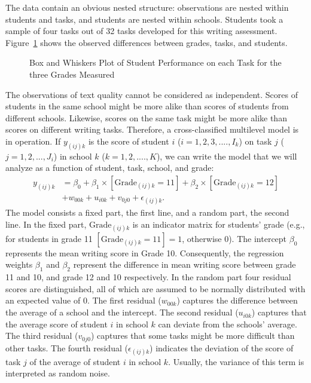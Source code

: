 \documentclass[man, floatsintext]{apa7}
\newenvironment{nscenter}
{\parskip=0pt\par\nopagebreak\centering}
{\par\noindent\ignorespacesafterend}
\newcommand\PlaceInsert[1]{%
	\smallskip%
	\begin{nscenter}
		\framebox{\Cref{#1} about here.}
	\end{nscenter}
	\smallskip%
}
\begin{document}
The data contain an obvious nested structure: observations are nested within students and tasks, and students are nested within schools.
Students took a sample of four tasks out of 32 tasks developed for this writing assessment.
Figure~\ref{fig:baselineDescriptives} shows the observed differences between grades, tasks, and students.
\PlaceInsert{fig:baselineDescriptives}
\begin{figure}[!ht]
	\caption{Box and Whiskers Plot of Student Performance on each Task for the three Grades Measured}
	\label{fig:baselineDescriptives}
\end{figure}
The observations of text quality cannot be considered as independent.
Scores of students in the same school might be more alike than scores of students from different schools.
Likewise, scores on the same task might be more alike than scores on different writing tasks.
Therefore, a cross-classified multilevel model is in operation.
If $y_{(ij)k}$ is the score of student $i$ ($i = 1, 2, 3, ...., I_k$) on task $j$ ($j = 1, 2, ..., J_i$) in school $k$ ($k = 1, 2, ...., K$), we can write the model that we will analyze as a function of student, task, school, and grade:
\begin{align*}
	y_{(ij)k} &= \beta_0 + \beta_1 \times [\mathrm{Grade}_{(ij)k}=11] + \beta_2 \times [\mathrm{Grade}_{(ij)k}=12]\\
			  &+ w_{00k} + u_{i0k} + v_{0j0} + \epsilon_{(ij)k}.
\end{align*}
The model consists a fixed part, the first line, and a random part, the second line. In the fixed part, $\mathrm{Grade}_{(ij)k}$ is an indicator matrix for students' grade (e.g., for students in grade 11 $[\mathrm{Grade}_{(ij)k}=11] = 1$, otherwise 0). The intercept $\beta_0$ represents the mean writing score in Grade 10. Consequently, the regression weights $\beta_1$ and $\beta_2$ represent the difference in mean writing score between grade 11 and 10, and grade 12 and 10 respectively. In the random part four residual scores are distinguished, all of which are assumed to be normally distributed with an expected value of 0. The first residual ($w_{00k}$) captures the difference between the average of a school and the intercept. The second residual ($u_{i0k}$) captures that the average score of student $i$ in school $k$ can deviate from the schools' average. The third residual ($v_{0j0}$) captures that some tasks might be more difficult than other tasks. The fourth residual ($\epsilon_{(ij)k}$) indicates the deviation of the score of task $j$ of the average of student $i$ in school $k$. Usually, the variance of this term is interpreted as random noise.
\end{document}
